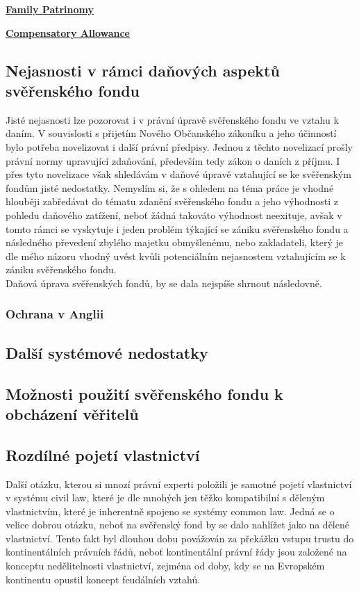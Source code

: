 \documentclass{article}
\begin{document}
\underline{\textbf{Family Patrinomy}}

\underline{\textbf{Compensatory Allowance}}

\subsection{Nejasnosti v rámci daňových aspektů svěřenského fondu}

Jisté nejasnosti lze pozorovat i v právní úpravě svěřenského fondu ve vztahu k daním. V souvislosti s přijetím Nového Občanského zákoníku a jeho účinností bylo potřeba novelizovat i další právní předpisy. Jednou z těchto novelizací prošly právní normy upravující zdaňování, především tedy zákon o daních z příjmu. I přes tyto novelizace však shledávám v daňové úpravě vztahující se ke svěřenským fondům jisté nedostatky. Nemyslím si, že s ohledem na téma práce je vhodné hlouběji zabředávat do tématu zdanění svěřenského fondu a jeho výhodnosti z pohledu daňového zatížení, neboť žádná takováto výhodnost neexituje, avšak v tomto rámci se vyskytuje i jeden problém týkající se zániku svěřenského fondu a následného převedení zbylého majetku obmyšlenému, nebo zakladateli, který je dle mého názoru vhodný uvést kvůli potenciálním nejasnostem vztahujícím se k zániku svěřenského fondu.\\

Daňová úprava svěřenských fondů, by se dala nejspíše shrnout následovně.

\subsubsection{Ochrana v Anglii}


\subsection{Další systémové nedostatky}

\subsection{Možnosti použití svěřenského fondu k obcházení věřitelů}
\subsection{Rozdílné pojetí vlastnictví}

Další otázku, kterou si mnozí právní experti položili je samotné pojetí vlastnictví v systému civil law, které je dle mnohých jen těžko kompatibilní s děleným vlastnictvím, které je inherentně spojeno se systémy common law.
Jedná se o velice dobrou otázku, neboť na svěřenský fond by se dalo nahlížet jako na dělené vlastnictví. Tento fakt byl dlouhou dobu povážován za překážku vstupu trustu do kontinentálních právních řádů, neboť kontinentální právní řády jsou založené na konceptu nedělitelnosti vlastnictví, zejména od doby, kdy se na Evropském kontinentu opustil koncept feudálních vztahů.\\
\end{document}
